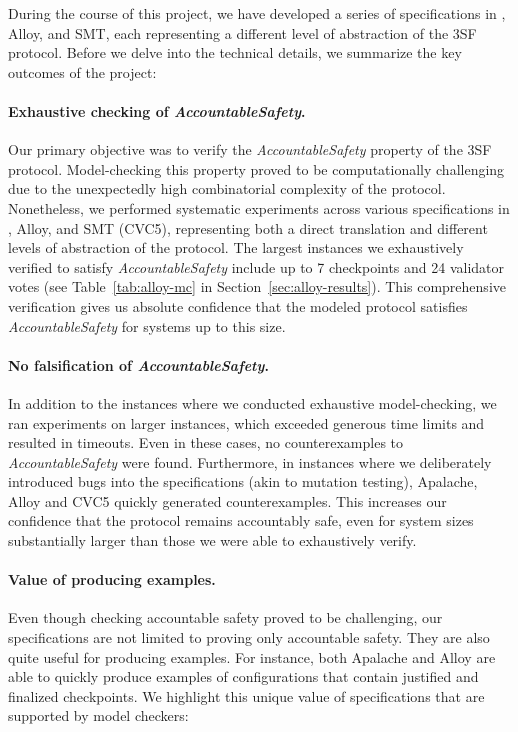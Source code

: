 
During the course of this project, we have developed a series of specifications
in \tlap{}, Alloy, and SMT, each representing a different level of abstraction
of the 3SF protocol. Before we delve into the technical details, we summarize
the key outcomes of the project:

\paragraph{Exhaustive checking of \textit{AccountableSafety}.} Our primary
objective was to verify the \textit{AccountableSafety} property of the 3SF
protocol. Model-checking this property proved to be computationally challenging
due to the unexpectedly high combinatorial complexity of the protocol.
Nonetheless, we performed systematic experiments across various specifications
in \tlap{}, Alloy, and SMT (CVC5), representing both a direct translation and
different levels of abstraction of the protocol. The largest instances we
exhaustively verified to satisfy \textit{AccountableSafety} include up to 7
checkpoints and 24 validator votes (see Table~\ref{tab:alloy-mc} in
Section~\ref{sec:alloy-results}). This comprehensive verification gives us
absolute confidence that the modeled protocol satisfies
\textit{AccountableSafety} for systems up to this size.

\paragraph{No falsification of \textit{AccountableSafety}.} In addition to the
instances where we conducted exhaustive model-checking, we ran experiments on
larger instances, which exceeded generous time limits and resulted in timeouts.
Even in these cases, no counterexamples to \textit{AccountableSafety} were
found. Furthermore, in instances where we deliberately introduced bugs into the
specifications (akin to mutation testing), Apalache, Alloy and CVC5 quickly
generated counterexamples. This increases our confidence that the protocol
remains accountably safe, even for system sizes substantially larger than
those we were able to exhaustively verify.

\paragraph{Value of producing examples.} Even though checking accountable
safety proved to be challenging, our specifications are not limited to proving
only accountable safety. They are also quite useful for producing examples. For
instance, both Apalache and Alloy are able to quickly produce examples of
configurations that contain justified and finalized checkpoints. We highlight
this unique value of specifications that are supported by model checkers:

